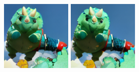 \begin{figure}[h]
\begin{minipage}{0.15\textwidth}
    \end{minipage}
    \begin{minipage}{0.15\textwidth}
        \centering
        \includegraphics[width=\linewidth]{material/65k/40.png}
    \end{minipage}
    \begin{minipage}{0.15\textwidth}
        \centering
        \includegraphics[width=\linewidth]{material/262k/40.png}
    \end{minipage}


\end{figure}

